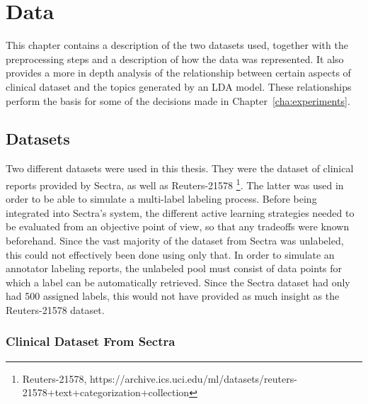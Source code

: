 \chapter{Data}
\label{cha:data}

This chapter contains a description of the two datasets used, together with the preprocessing steps and a description of how the data was represented.
It also provides a more in depth analysis of the relationship between certain aspects of clinical dataset and the topics generated by an LDA model.
These relationships perform the basis for some of the decisions made in Chapter~\ref{cha:experiments}.

\section{Datasets}\label{sec:datasets}

Two different datasets were used in this thesis.
They were the dataset of clinical reports provided by Sectra, as well as Reuters-21578 \footnote{Reuters-21578, https://archive.ics.uci.edu/ml/datasets/reuters-21578+text+categorization+collection}.
The latter was used in order to be able to simulate a multi-label labeling process.
Before being integrated into Sectra's system, the different active learning strategies needed to be evaluated from an objective point of view, so that any tradeoffs were known beforehand.
Since the vast majority of the dataset from Sectra was unlabeled, this could not effectively been done using only that.
In order to simulate an annotator labeling reports, the unlabeled pool must consist of data points for which a label can be automatically retrieved.
Since the Sectra dataset had only had 500 assigned labels, this would not have provided as much insight as the Reuters-21578 dataset.

\subsection{Clinical Dataset From Sectra}

